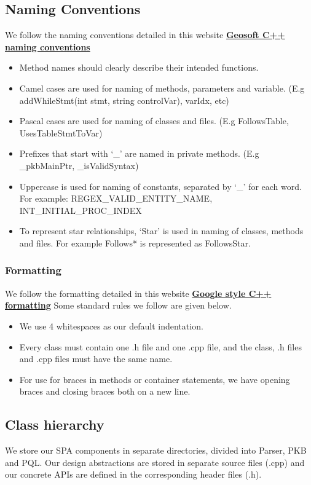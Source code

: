 \documentclass[12pt]{article}
\begin{document}
{{{{{{{{{{{{{\subsection{Naming Conventions}
We follow the naming conventions detailed in this website 
\href{http://geosoft.no/development/cppstyle.html#Naming Conventions}{\textbf{Geosoft C++ naming conventions}}
\begin{itemize}
\item Method names should clearly describe their intended functions. 
\item Camel cases are used for naming of methods, parameters and variable.
(E.g addWhileStmt(int stmt, string controlVar), varIdx, etc)
\item Pascal cases are used for naming of classes and files. (E.g FollowsTable, UsesTableStmtToVar)
\item Prefixes that start with ‘\_’ are named in private methods.
(E.g \_pkbMainPtr, \_isValidSyntax)
\item Uppercase is used for naming of constants, separated by ‘\_’ for each word.
For example: REGEX\_VALID\_ENTITY\_NAME, INT\_INITIAL\_PROC\_INDEX
\item To represent star relationships, ‘Star’ is used in naming of classes, methods and files. For example Follows* is represented as FollowsStar.
\end{itemize}
\subsubsection{Formatting}
We follow the formatting detailed in this website 
\href{https://google.github.io/styleguide/cppguide.html#Formatting}{\textbf{Google style C++ formatting}} 
\newline Some standard rules we follow are given below.
\begin{itemize}
\item We use 4 whitespaces as our default indentation.
\item Every class must contain one .h file and one .cpp file, and the class, .h files and .cpp files must have the same name.
\item For use for braces in methods or container statements, we have opening braces and closing braces both on a new line.
\end{itemize}
\subsection{Class hierarchy}
We store our SPA components in separate directories, divided into Parser, PKB and PQL. Our design abstractions are stored in separate source files (.cpp) and our concrete APIs are defined in the corresponding header files (.h).


}}}}}}}}}}}}}
\end{document}
